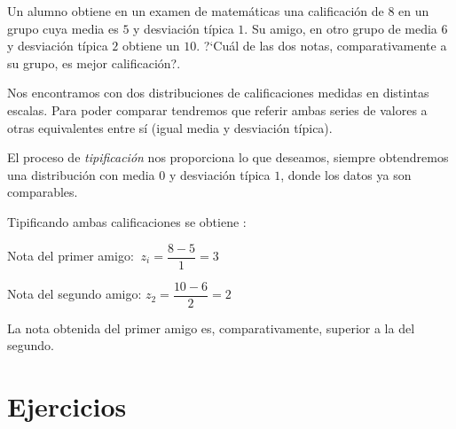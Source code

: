 \vspace{15mm}%
\begin{example}

Un alumno obtiene en un examen de matemáticas una calificación de $8$ en un grupo cuya media es $5$ y desviación típica $1$. Su amigo, en otro grupo de media $6$ y desviación típica $2$ obtiene un $10$. ?`Cuál de las dos notas, comparativamente a su grupo, es mejor calificación?. 

\vspace{4mm} Nos encontramos con dos distribuciones de calificaciones medidas en distintas escalas. Para poder comparar tendremos que referir ambas series de valores a otras equivalentes entre sí (igual media y desviación típica). 

\vspace{2mm} El proceso de \emph{tipificación} nos proporciona lo que deseamos, siempre obtendremos una distribución con media $0$ y desviación típica $1$, donde los datos ya son comparables.
 
\vspace{2mm} Tipificando ambas calificaciones se obtiene :

\vspace{2mm} Nota del primer amigo: $\ z_i=\dfrac{8-5}{1}=3$

\vspace{2mm} Nota del segundo amigo: $z_2=\dfrac{10-6}{2}=2$ 

\vspace{2mm} La nota obtenida del primer amigo es, comparativamente,  superior a la del segundo. 
\end{example}

\newpage %
\section{Ejercicios}
	
